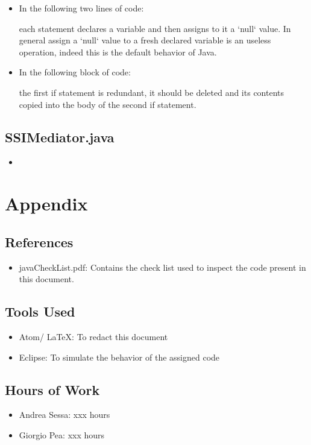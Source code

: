 \documentclass[11pt,titlepage]{article} %
\begin{document}
\begin{itemize}
\begin{itemize}
	     \item In the following two lines of code:
		
		each statement declares a variable and then assigns to it a `null` value. In general assign a `null` value to a fresh declared
		variable is an useless operation, indeed this is the default behavior of Java.
		
	     \item In the following block of code:
		
		the first if statement is redundant, it should be deleted and its contents copied into the body of the second if statement.  
	    \end{itemize}
   \end{itemize}
  \subsection{SSIMediator.java}
    \begin{itemize}
     \item 
    \end{itemize}

\newpage
\section{Appendix}
\subsection{References}
   \begin{itemize}
    \item javaCheckList.pdf: Contains the check list used to inspect the code present in this document.
   \end{itemize}
\subsection{Tools Used}
  \begin{itemize}
   \item Atom/ \LaTeX: To redact this document
   \item Eclipse: To simulate the behavior of the assigned code
  \end{itemize}
\subsection{Hours of Work}
  \begin{itemize}
   \item Andrea Sessa: xxx hours
   \item Giorgio Pea: xxx hours
  \end{itemize}
\end{document}
